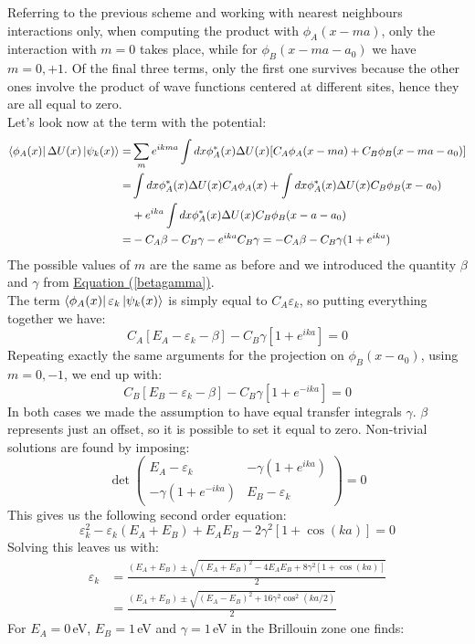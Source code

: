 \documentclass[10.75pt,a4paper,openright,bottom=2cm]{article}
\renewcommand{\refeq}[1]{\hyperref[#1]{Equation (\ref{#1})}}
\begin{document}
Referring to the previous scheme and working with nearest neighbours interactions only, when computing the product with $\phi_A(x-ma)$, only the interaction with $m=0$ takes place, while for $\phi_B(x-ma-a_0)$ we have $m=0,+1$. Of the final three terms, only the first one survives because the other ones involve the product of wave functions centered at different sites, hence they are all equal to zero.\\
Let's look now at the term with the potential:
\begin{align*}
\bra{\phi_A(x)}\Delta U(x)\ket{\psi_k(x)}=&\sum_me^{ikma}\int dx\phi_A^*(x)\Delta U(x)[C_A\phi_A(x-ma)+C_B\phi_B(x-ma-a_0)]\\
=&\int dx\phi_A^*(x)\Delta U(x)C_A\phi_A(x)+\int dx\phi_A^*(x)\Delta U(x)C_B\phi_B(x-a_0)\\
&+e^{ika}\int dx\phi_A^*(x)\Delta U(x)C_B\phi_B(x-a-a_0)\\
=&-C_A\beta-C_B\gamma-e^{ika}C_B\gamma=-C_A\beta-C_B\gamma(1+e^{ika})
\end{align*}
The possible values of $m$ are the same as before and we introduced the quantity $\beta$ and $\gamma$ from \refeq{betagamma}.\\
The term $\bra{\phi_A(x)}\varepsilon_k\ket{\psi_k(x)}$ is simply equal to $C_A\varepsilon_k$, so putting everything together we have:
\[
C_A[E_A-\varepsilon_k-\beta]-C_B\gamma[1+e^{ika}]=0
\]
Repeating exactly the same arguments for the projection on $\phi_B(x-a_0)$, using $m=0,-1$, we end up with:
\[
C_B[E_B-\varepsilon_k-\beta]-C_B\gamma[1+e^{-ika}]=0
\]
In both cases we made the assumption to have equal transfer integrals $\gamma$. $\beta$ represents just an offset, so it is possible to set it equal to zero. Non-trivial solutions are found by imposing:
\[
\det\left(\begin{array}{cc}
    E_A-\varepsilon_k & -\gamma(1+e^{ika}) \\
    -\gamma(1+e^{-ika}) & E_B-\varepsilon_k
\end{array}\right)=0
\]
This gives us the following second order equation:
\[
\varepsilon_k^2-\varepsilon_k(E_A+E_B)+E_AE_B-2\gamma^2[1+\cos(ka)]=0
\]
Solving this leaves us with:
\begin{align*}
\varepsilon_k&=\frac{(E_A+E_B)\pm\sqrt{(E_A+E_B)^2-4E_AE_B+8\gamma^2[1+\cos(ka)]}}{2}\\
&=\frac{(E_A+E_B)\pm\sqrt{(E_A-E_B)^2+16\gamma^2\cos^2(ka/2)}}{2}
\end{align*}
For $E_A=0$\,eV, $E_B=1$\,eV and $\gamma=1$\,eV in the  Brillouin zone one finds:
\end{document}
